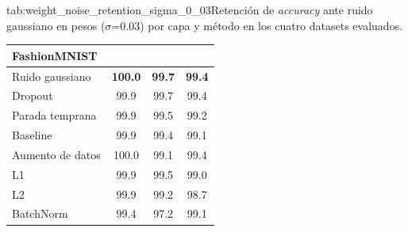 \begin{table}{tab:weight_noise_retention_sigma_0_03}{Retención de \textit{accuracy} ante ruido gaussiano en pesos ($\sigma$=0.03) por capa y método en los cuatro datasets evaluados.}
\begin{tabular}{lccc}
\multicolumn{4}{l}{\textbf{FashionMNIST}}\\
\midrule
Ruido gaussiano & \textbf{100.0} & \textbf{99.7} & \textbf{99.4} \\
Dropout & 99.9 & 99.7 & 99.4 \\
Parada temprana & 99.9 & 99.5 & 99.2 \\
Baseline & 99.9 & 99.4 & 99.1 \\
Aumento de datos & 100.0 & 99.1 & 99.4 \\
L1 & 99.9 & 99.5 & 99.0 \\
L2 & 99.9 & 99.2 & 98.7 \\
BatchNorm & 99.4 & 97.2 & 99.1 \\
\bottomrule
\end{tabular}
\end{table}
